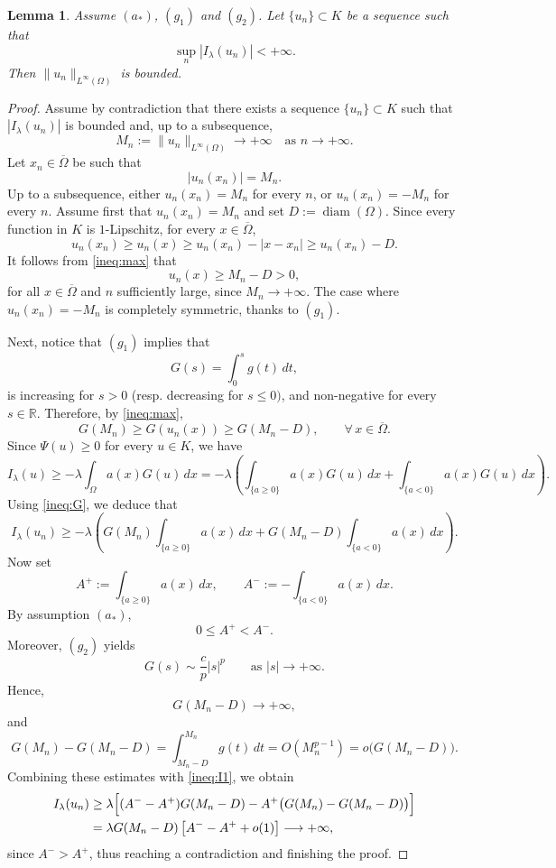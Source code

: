 \documentclass[11pt,reqno]{amsart}
\theoremstyle{plain}
\newtheorem{lemma}[theorem]{Lemma}
\theoremstyle{definition}
\numberwithin{equation}{section}
\newcommand{\R}{\mathbb{R}}
\begin{document}
\begin{lemma} \label{boundness}
Assume $(a_*)$, $(g_1)$ and $(g_2)$. Let $\{u_n\}\subset K$ be a sequence such that $$\sup_n |I_\lambda(u_n)|<+\infty.$$ Then $\|u_n\|_{L^\infty(\Omega)}$ is bounded.
\end{lemma}
\begin{proof}
Assume by contradiction that there exists a sequence $\{u_n\} \subset K$ such that $|I_\lambda(u_n)|$ is bounded and, up to a subsequence,
$$
M_n:=\|u_n\|_{L^{\infty}(\Omega)} \rightarrow +\infty
\quad\text{as } n\to+\infty.
$$
Let $x_n\in\overline{\Omega}$ be such that
\[
|u_n(x_n)|=M_n.
\]
Up to a subsequence, either $u_n(x_n)=M_n$ for every $n$, or
$u_n(x_n)=-M_n$ for every $n$. Assume first that
$u_n(x_n)=M_n$ and set $D:=\operatorname{diam}(\Omega)$. Since every function in $K$ is $1$-Lipschitz, for every $x\in\overline{\Omega}$,
\begin{equation}\label{ineq:max}
u_n(x_n)\ge u_n(x)\ge u_n(x_n)-|x-x_n|
\ge u_n(x_n)-D.
\end{equation}
It follows from \eqref{ineq:max} that
$$
u_n(x)\ge M_n-D>0,
$$
for all $x\in\overline{\Omega}$ and $n$ sufficiently large, since $M_n\to+\infty$. The case where $u_n(x_n)=-M_n$ is completely symmetric, thanks to $(g_1)$.

\medskip

Next, notice that $(g_1)$ implies that
$$
G(s)=\int_0^s g(t)\,dt,
$$
is increasing for $s > 0$ (resp. decreasing for $s\leq 0)$, and non-negative for every $s \in \R$. Therefore, by \eqref{ineq:max},
\begin{equation}\label{ineq:G}
G(M_n)\ge G(u_n(x))\ge G(M_n-D),
\qquad
\forall\,x\in\overline{\Omega}.
\end{equation}
Since $\Psi(u)\ge0$ for every $u\in K$, we have
$$
I_\lambda(u)\ge
-\lambda\int_\Omega a(x)G(u)\,dx
=
-\lambda\left(
\int_{\{a\ge0\}}a(x)G(u)\,dx
+
\int_{\{a<0\}}a(x)G(u)\,dx
\right).
$$
Using \eqref{ineq:G}, we deduce that
\begin{equation}\label{ineq:I1}
I_\lambda(u_n)\ge
-\lambda\left(
G(M_n)\int_{\{a\ge0\}}a(x)\,dx
+
G(M_n-D)\int_{\{a<0\}}a(x)\,dx
\right).
\end{equation}
Now set
\begin{equation} \label{eq:notation}
A^+:=\int_{\{a\ge0\}}a(x)\,dx,
\qquad
A^-:=-\int_{\{a<0\}}a(x)\,dx.
\end{equation}
By assumption $(a_*)$,
$$
0\le A^+<A^-.
$$
Moreover, $(g_2)$ yields
$$
G(s)\sim \frac{c}{p}|s|^p
\qquad\text{as }|s|\to+\infty.
$$
Hence,
$$
G(M_n-D)\to+\infty,
$$
and
$$
G(M_n)-G(M_n-D)
=
\int_{M_n-D}^{M_n}g(t)\,dt
=
O(M_n^{p-1})
=
o\bigl(G(M_n-D)\bigr).
$$
Combining these estimates with \eqref{ineq:I1}, we obtain
\begin{equation} \label{eq:coerc}
\begin{aligned} 
I_\lambda(u_n)
&\ge
\lambda\Bigl[
(A^- - A^+)G(M_n-D)
-
A^+\bigl(G(M_n)-G(M_n-D)\bigr)
\Bigr] \\
&=
\lambda G(M_n-D)
\left[
A^- - A^+ + o(1)
\right]
\longrightarrow+\infty,
\end{aligned}
\end{equation}
since $A^->A^+$, thus reaching a contradiction and finishing the proof.
\end{proof}
\end{document}
